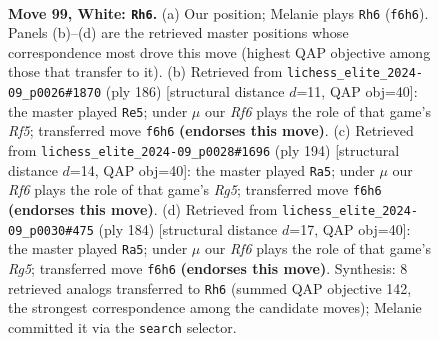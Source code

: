\documentclass[11pt]{article}
\begin{document}
\clearpage

\begin{figure}[p]\centering
\begin{subfigure}{0.46\textwidth}\centering
\resizebox{\linewidth}{!}{%
\newchessgame
\chessboard[
  setfen={8/4k3/4pR2/8/1R2P3/5PK1/8/r7 w - - 1 99},
  showmover=false,
  pgfstyle=straightmove, color=movearrow, markmove={f6-h6}
]}
\caption{}
\end{subfigure}\hfill
\begin{subfigure}{0.46\textwidth}\centering
\resizebox{\linewidth}{!}{%
\newchessgame
\chessboard[
  setfen={8/8/6k1/5Rp1/6P1/5P2/5K2/1r6 w - - 94 94},
  showmover=false,
  pgfstyle=straightmove, color=movearrow, markmove={f5-e5}
]}
\caption{}
\end{subfigure}
\\[4pt]
\begin{subfigure}{0.46\textwidth}\centering
\resizebox{\linewidth}{!}{%
\newchessgame
\chessboard[
  setfen={8/8/7k/6Rp/7P/6P1/7K/1r6 w - - 72 98},
  showmover=false,
  pgfstyle=straightmove, color=movearrow, markmove={g5-a5}
]}
\caption{}
\end{subfigure}\hfill
\begin{subfigure}{0.46\textwidth}\centering
\resizebox{\linewidth}{!}{%
\newchessgame
\chessboard[
  setfen={8/8/7k/6Rp/7P/6PK/8/1r6 w - - 31 93},
  showmover=false,
  pgfstyle=straightmove, color=movearrow, markmove={g5-a5}
]}
\caption{}
\end{subfigure}
\caption{\textbf{Move 99, White: \texttt{Rh6}.} (a) Our position; Melanie plays \texttt{Rh6} (\texttt{f6h6}). Panels (b)--(d) are the retrieved master positions whose correspondence most drove this move (highest QAP objective among those that transfer to it). (b) Retrieved from \texttt{lichess\_elite\_2024-09\_p0026\#1870} (ply 186) [structural distance $d$=11, QAP obj=40]: the master played \texttt{Re5}; under $\mu$ our \emph{Rf6} plays the role of that game's \emph{Rf5}; transferred move \texttt{f6h6} \textbf{(endorses this move)}. (c) Retrieved from \texttt{lichess\_elite\_2024-09\_p0028\#1696} (ply 194) [structural distance $d$=14, QAP obj=40]: the master played \texttt{Ra5}; under $\mu$ our \emph{Rf6} plays the role of that game's \emph{Rg5}; transferred move \texttt{f6h6} \textbf{(endorses this move)}. (d) Retrieved from \texttt{lichess\_elite\_2024-09\_p0030\#475} (ply 184) [structural distance $d$=17, QAP obj=40]: the master played \texttt{Ra5}; under $\mu$ our \emph{Rf6} plays the role of that game's \emph{Rg5}; transferred move \texttt{f6h6} \textbf{(endorses this move)}. Synthesis: 8 retrieved analogs transferred to \texttt{Rh6} (summed QAP objective 142, the strongest correspondence among the candidate moves); Melanie committed it via the \texttt{search} selector.}
\label{fig:thought-m196}
\end{figure}
\end{document}
